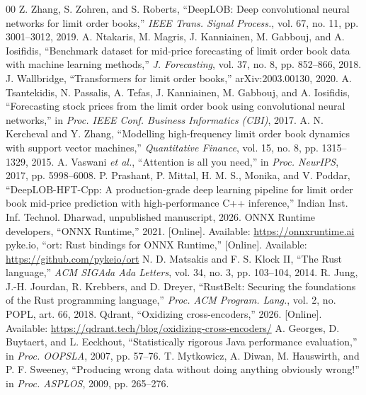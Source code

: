 \documentclass[conference]{IEEEtran}
\begin{document}
\balance
\begin{thebibliography}{00}
 Z. Zhang, S. Zohren, and S. Roberts, ``DeepLOB: Deep convolutional neural networks for limit order books,'' \textit{IEEE Trans. Signal Process.}, vol. 67, no. 11, pp. 3001--3012, 2019.
 A. Ntakaris, M. Magris, J. Kanniainen, M. Gabbouj, and A. Iosifidis, ``Benchmark dataset for mid-price forecasting of limit order book data with machine learning methods,'' \textit{J. Forecasting}, vol. 37, no. 8, pp. 852--866, 2018.
 J. Wallbridge, ``Transformers for limit order books,'' arXiv:2003.00130, 2020.
 A. Tsantekidis, N. Passalis, A. Tefas, J. Kanniainen, M. Gabbouj, and A. Iosifidis, ``Forecasting stock prices from the limit order book using convolutional neural networks,'' in \textit{Proc. IEEE Conf. Business Informatics (CBI)}, 2017.
 A. N. Kercheval and Y. Zhang, ``Modelling high-frequency limit order book dynamics with support vector machines,'' \textit{Quantitative Finance}, vol. 15, no. 8, pp. 1315--1329, 2015.
 A. Vaswani \textit{et al.}, ``Attention is all you need,'' in \textit{Proc. NeurIPS}, 2017, pp. 5998--6008.
 P. Prashant, P. Mittal, H. M. S., Monika, and V. Poddar, ``DeepLOB-HFT-Cpp: A production-grade deep learning pipeline for limit order book mid-price prediction with high-performance C++ inference,'' Indian Inst. Inf. Technol. Dharwad, unpublished manuscript, 2026.
 ONNX Runtime developers, ``ONNX Runtime,'' 2021. [Online]. Available: \url{https://onnxruntime.ai}
 pyke.io, ``ort: Rust bindings for ONNX Runtime,'' [Online]. Available: \url{https://github.com/pykeio/ort}
 N. D. Matsakis and F. S. Klock II, ``The Rust language,'' \textit{ACM SIGAda Ada Letters}, vol. 34, no. 3, pp. 103--104, 2014.
 R. Jung, J.-H. Jourdan, R. Krebbers, and D. Dreyer, ``RustBelt: Securing the foundations of the Rust programming language,'' \textit{Proc. ACM Program. Lang.}, vol. 2, no. POPL, art. 66, 2018.
 Qdrant, ``Oxidizing cross-encoders,'' 2026. [Online]. Available: \url{https://qdrant.tech/blog/oxidizing-cross-encoders/}
 A. Georges, D. Buytaert, and L. Eeckhout, ``Statistically rigorous Java performance evaluation,'' in \textit{Proc. OOPSLA}, 2007, pp. 57--76.
 T. Mytkowicz, A. Diwan, M. Hauswirth, and P. F. Sweeney, ``Producing wrong data without doing anything obviously wrong!'' in \textit{Proc. ASPLOS}, 2009, pp. 265--276.

\end{thebibliography}
\end{document}
